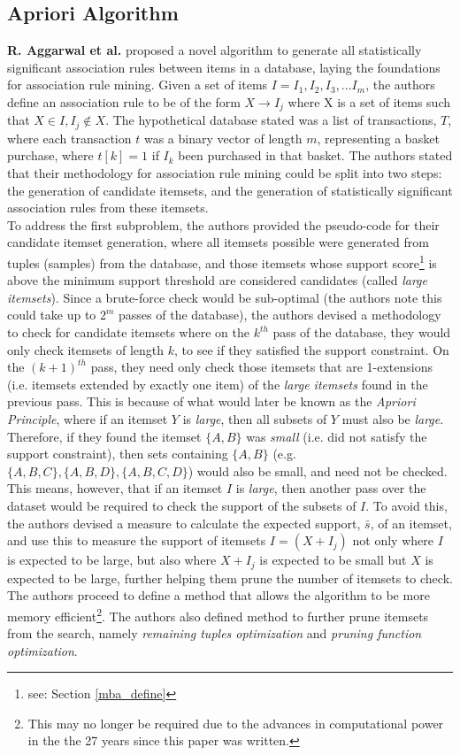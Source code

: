 \documentclass[paper=a4,fontsize=11pt]{report}	%
\begin{document}
\subsection{Apriori Algorithm}
\textbf{R. Aggarwal et al.} \cite{mine} proposed a novel algorithm to generate all statistically significant association rules between items in a database, laying the foundations for association rule mining.  Given a set of items $I = I_1, I_2, I_3,...I_m$, the authors define an association rule to be of the form $X \rightarrow I_j$ where X is a set of items such that $X \in I, I_j \notin X$.  The hypothetical database stated was a list of transactions, $T$, where each transaction $t$ was a binary vector of length $m$, representing a basket purchase, where $t[k] = 1$ if $I_k$ been purchased in that basket.  The authors stated that their methodology for association rule mining could be split into two steps: the generation of candidate itemsets, and the generation of statistically significant association rules from these itemsets. \\
To address the first subproblem, the authors provided the pseudo-code for their candidate itemset generation,  where all itemsets possible were generated from tuples (samples) from the database,  and those itemsets whose support score\footnote{see: Section \ref{mba_define}} is above the minimum support threshold are considered candidates (called \textit{large itemsets}).  Since a brute-force check would be sub-optimal  (the authors note this could take up to $2^m$ passes of the database),  the authors devised a methodology to check for candidate itemsets where on the $k^{th}$ pass of the database, they would only check itemsets of length $k$, to see if they satisfied the support constraint. On the $(k+1)^{th}$ pass, they need only check those itemsets that are 1-extensions (i.e.  itemsets extended by exactly one item) of the \textit{large itemsets} found in the previous pass. This is because of what would later be known as the \textit{Apriori Principle}, where if an itemset $Y$ is \textit{large}, then all subsets of $Y$ must also be \textit{large}. Therefore, if they found the itemset $\{A,B\}$ was \textit{small} (i.e. did not satisfy the support constraint), then sets containing $\{A,B\}$ (e.g. $\{A,B, C\}, \{A,B, D\}, \{A,B, C, D\}$) would also be small, and need not be checked. This means, however, that if an itemset $I$ is \textit{large}, then another pass over the dataset would be required to check the support of the subsets of $I$. To avoid this, the authors devised a measure to calculate the expected support, $\bar{s}$, of an itemset,  and use this to measure the support of itemsets $I = (X + I_j)$ not only where $I$ is expected to be large, but also where $X+I_j$ is expected to be small but $X$ is expected to be large, further helping them prune the number of itemsets to check.  The authors proceed to define a method that allows the algorithm to be more memory efficient\footnote{This may no longer be required due to the advances in computational power in the the 27 years since this paper was written.}. The authors also defined method to further prune itemsets from the search, namely \textit{remaining tuples optimization} and \textit{pruning function optimization}.\\
\end{document}
